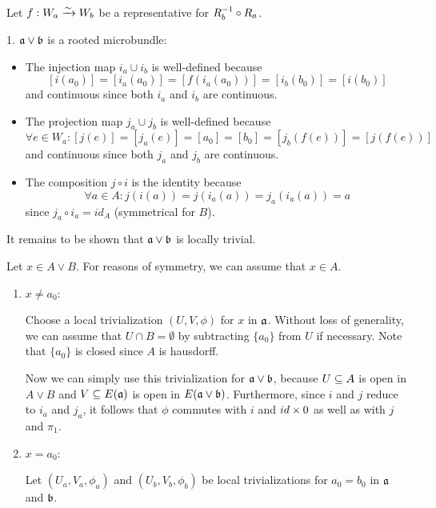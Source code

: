 \begin{myproof}
    Let $f: W_a \xrightarrow{\sim} W_b$ be a representative for $R_b^{-1} \circ R_a$.

    1. $\ba \vee \bb$ is a rooted microbundle:
    \begin{itemize}
        \item The injection map $i_a \cup i_b$ is well-defined because 
        \[ [i(a_0)] = [i_a(a_0)] = [f(i_a(a_0))] = [i_b(b_0)] = [i(b_0)] \]
        and continuous since both $i_a$ and $i_b$ are continuous.
        \item The projection map $j_a \cup j_b$ is well-defined because
        \[ \forall e \in W_a: [j(e)] = [j_a(e)] = [a_0] = [b_0] = [j_b(f(e))] = [j(f(e))] \]
        and continuous since both $j_a$ and $j_b$ are continuous.
        \item The composition $j \circ i$ is the identity because
        \[ \forall a \in A: j(i(a)) = j(i_a(a)) = j_a(i_a(a)) = a \]
        since $j_a \circ i_a = id_A$ (symmetrical for $B$).
    \end{itemize}
    It remains to be shown that $\ba \vee \bb$ is locally trivial.

    Let $x \in A \vee B$.
    For reasons of symmetry, we can assume that $x \in A$.
    \begin{enumerate}
        \item $x \neq a_0$:
        
        Choose a local trivialization $(U, V, \phi)$ for $x$ in $\mathfrak{a}$.
        Without loss of generality,
        we can assume that $U \cap B = \emptyset$ by subtracting
        $\{a_0\}$ from $U$ if necessary.
        Note that $\{a_0\}$ is closed since $A$ is hausdorff.
        
        Now we can simply use this trivialization for $\ba \vee \bb$, because
        $U \subseteq{} A$ is open in $A \vee B$ and
        $V \subseteq{} E(\mathfrak{a})$ is open in $E(\ba \vee \bb)$.
        Furthermore, since $i$ and $j$ reduce to $i_a$ and $j_a$,
        it follows that $\phi$ commutes with $i$ and $id \times 0$
        as well as with $j$ and $\pi_1$.

        \item $x = a_0$:
        
        Let $(U_a, V_a, \phi_a)$ and $(U_b, V_b, \phi_b)$ be local trivializations
        for $a_0 = b_0$ in $\mathfrak{a}$ and $\bb$.


\end{enumerate}
\end{myproof}
